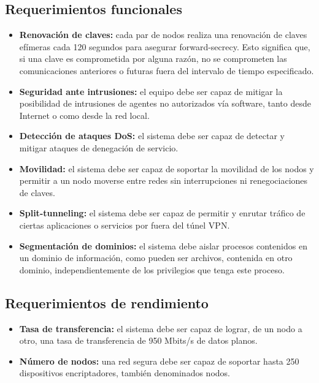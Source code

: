 \documentclass[12pt]{article}
\begin{document}
\subsection{Requerimientos funcionales}
\begin{itemize}
    \item \textbf{Renovación de claves:} cada par de nodos realiza una renovación de claves efímeras cada 120 segundos para asegurar forward-secrecy. Esto significa que, si una clave es comprometida por alguna razón, no se comprometen las comunicaciones anteriores o futuras fuera del intervalo de tiempo especificado.
    \item \textbf{Seguridad ante intrusiones:} el equipo debe ser capaz de  mitigar la posibilidad de intrusiones de agentes no autorizados vía software, tanto desde Internet o como desde la red local.
    \item \textbf{Detección de ataques DoS:} el sistema debe ser capaz de detectar y mitigar ataques de denegación de servicio.
    \item \textbf{Movilidad:} el sistema debe ser capaz de soportar la movilidad de los nodos y permitir a un nodo moverse entre redes sin interrupciones ni renegociaciones de claves. 
    \item \textbf{Split-tunneling:} el sistema debe ser capaz de permitir y enrutar tráfico de ciertas aplicaciones o servicios por fuera del túnel VPN. 
    \item \textbf{Segmentación de dominios: } el sistema debe aislar procesos contenidos en un dominio de información, como pueden ser archivos, contenida en otro dominio, independientemente de los privilegios que tenga este proceso.
\end{itemize}

\subsection{Requerimientos de rendimiento}
\begin{itemize}
    \item \textbf{Tasa de transferencia:} el sistema debe ser capaz de lograr, de un nodo a otro, una tasa de transferencia de 950 Mbits/s de datos planos.
    \item \textbf{Número de nodos:} una red segura debe ser capaz de soportar hasta 250 dispositivos encriptadores, también denominados nodos. 
\end{itemize}
\end{document}
